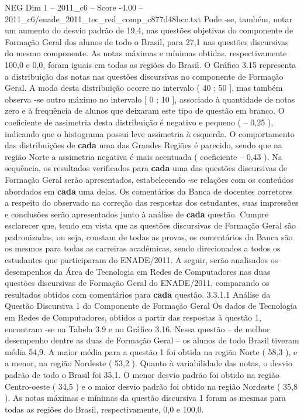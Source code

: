 \begin{textsample}{NEG Dim 1 – 2011\_c6 – Score -4.00 – 2011\_c6/enade\_2011\_tec\_red\_comp\_c877d48bcc.txt}
Pode -se, também, notar um aumento do desvio padrão de 19,4, nas questões objetivas do componente de Formação Geral dos alunos de todo o Brasil, para 27,1 nas questões discursivas do mesmo componente.
As notas máximas e mínimas obtidas, respectivamente 100,0 e 0,0, foram iguais em todas as regiões do Brasil.
O Gráfico 3.15 representa a distribuição das notas nas questões discursivas no componente de Formação Geral.
A moda desta distribuição ocorre no intervalo ( 40 ; 50 ], mas também observa -se outro máximo no intervalo [ 0 ; 10 ], associado à quantidade de notas zero e à frequência de alunos que deixaram este tipo de questão em branco.
O coeficiente de assimetria desta distribuição é negativo e pequeno ( – 0,25 ), indicando que o histograma possui leve assimetria à esquerda.
O comportamento das distribuições de \textbf{cada} uma das Grandes Regiões é parecido, sendo que na região Norte a assimetria negativa é mais acentuada ( coeficiente – 0,43 ).
Na sequência, os resultados verificados para \textbf{cada} uma das questões discursivas de Formação Geral serão apresentados, estabelecendo -se relações com os conteúdos abordados em \textbf{cada} uma delas.
Os comentários da Banca de docentes corretores a respeito do observado na correção das respostas dos estudantes, suas impressões e conclusões serão apresentados junto à análise de \textbf{cada} questão.
Cumpre esclarecer que, tendo em vista que as questões discursivas de Formação Geral são padronizadas, ou seja, constam de todas as provas, os comentários da Banca são os mesmos para todas as carreiras acadêmicas, sendo direcionados a todos os estudantes que participaram do ENADE/2011.
A seguir, serão analisados os desempenhos da Área de Tecnologia em Redes de Computadores nas duas questões discursivas de Formação Geral do ENADE/2011, comparando os resultados obtidos com comentários para \textbf{cada} questão. 3.3.1.1 Análise da Questão Discursiva 1 do Componente de Formação Geral Os dados de Tecnologia em Redes de Computadores, obtidos a partir das respostas à questão 1, encontram -se na Tabela 3.9 e no Gráfico 3.16.
Nessa questão – de melhor desempenho dentre as duas de Formação Geral – os alunos de todo Brasil tiveram média 54,9.
A maior média para a questão 1 foi obtida na região Norte ( 58,3 ), e a menor, na região Nordeste ( 53,2 ).
Quanto à variabilidade das notas, o desvio padrão de todo o Brasil foi 35,1.
O menor desvio padrão foi obtido na região Centro-oeste ( 34,5 ) e o maior desvio padrão foi obtido na região Nordeste ( 35,8 ).
As notas máximas e mínimas da questão discursiva 1 foram as mesmas para todas as regiões do Brasil, respectivamente, 0,0 e 100,0.

\end{textsample}
